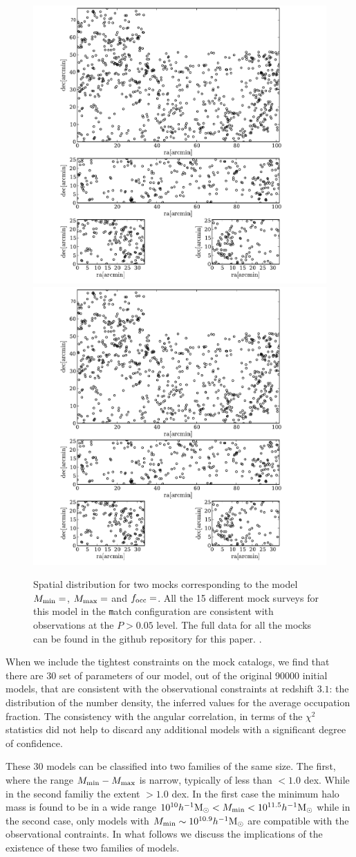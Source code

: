 \documentclass[usenatbib]{mn2e}
\newcommand{\hMsun}{{\ifmmode{h^{-1}{\rm {M_{\odot}}}}\else{$h^{-1}{\rm{M_{\odot}}}$}\fi}}
\begin{document}
\begin{figure}
\begin{center}
\includegraphics[width=0.49\linewidth,angle=0]{./plots/mytest.pdf}
\includegraphics[width=0.49\linewidth,angle=0]{./plots/mytest.pdf}
\end{center} 
\caption{Spatial distribution for two mocks corresponding to the model
  $M_{\rm min}=$, $M_{\rm max}=$ and $f_{\rm occ}=$. All the 15
  different mock  surveys for this model in the {\texttt match}
  configuration are consistent with observations at the $P>0.05$
  level. The full data for all the mocks can be found in the github
  repository for this paper.
  \label{figure:spatial_distro}.}
\end{figure}


When we include the tightest constraints on the mock catalogs, we find
that there are 30 set of parameters of our model, out of the original
90000 initial models, that are consistent with the observational
constraints at redshift $3.1$: the distribution of the number density,
the inferred values for the average occupation fraction. The
consistency with the angular correlation, in terms of the $\chi^2$
statistics did not help to discard any additional models with a
significant degree of confidence. 


These 30 models can be classified into two families of the same
size. The first, where the range $M_{\rm min}-M_{\rm max}$ is narrow,
typically of less than $<1.0$ dex. While in the second familiy the
extent $>1.0$ dex. In the first case the minimum halo mass is found to
be in a wide range $10^{10}\hMsun <M_{\rm min}< 10^{11.5}\hMsun$ while
in the second case, only models with $M_{\rm min}\sim 10^{10.9}\hMsun$
are compatible with the observational contraints. In what follows we
discuss the implications of the existence of these two families of
models.  
\end{document}
